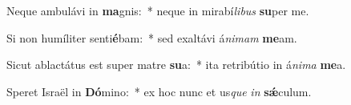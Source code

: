 \item Neque ambulávi in \textbf{ma}gnis:~* neque in mirabí\textit{li}\textit{bus} \textbf{su}per me.
\item Si non humíliter senti\textbf{é}bam:~* sed exaltávi á\textit{ni}\textit{mam} \textbf{me}am.
\item Sicut ablactátus est super matre \textbf{su}a:~* ita retribútio in á\textit{ni}\textit{ma} \textbf{me}a.
\item Speret Israël in \textbf{Dó}mino:~* ex hoc nunc et us\textit{que} \textit{in} \textbf{sǽ}culum.
